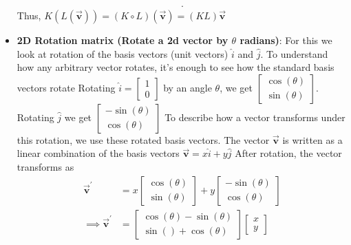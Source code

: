 \documentclass{report}
\begin{document}
\begin{itemize}
\begin{align*}
            .\end{align*}
            Thus, $K(L(\vec{\mathbf{v}})) = (K \circ L)(\vec{\mathbf{v}}) = (KL)\vec{\mathbf{v}}$
            \pagebreak 
        \item \textbf{2D Rotation matrix (Rotate a 2d vector by $\theta$ radians)}: For this we look at rotation of the basis vectors (unit vectors) $\hat{i}$ and $\hat{j}$. To understand how any arbitrary vector rotates, it's enough to see how the standard basis vectors rotate
            \bigbreak \noindent 
            Rotating $\hat{i} = \begin{bmatrix} 1 \\ 0 \end{bmatrix}$ by an angle $\theta$, we get $ \begin{bmatrix} \cos{\left(\theta \right)} \\ \sin{\left(\theta \right)}\end{bmatrix}$. Rotating $\hat{j}$ we get $ \begin{bmatrix}
                -\sin{\left(\theta \right)} \\ \cos{\left(\theta \right)}
            \end{bmatrix} $
            \bigbreak \noindent 
            To describe how a vector transforms under this rotation, we use these rotated basis vectors. The vector $\vec{\mathbf{v}} $ is written as a linear combination of the basis vectors $\vec{\mathbf{v}} = x\hat{i} + y\hat{j}$
            \bigbreak \noindent 
            After rotation, the vector transforms as 
            \begin{align*}
                \vec{\mathbf{v}}^{\prime} &= x \begin{bmatrix}\cos{\left(\theta \right)} \\ \sin{\left(\theta \right)}\end{bmatrix} +  y \begin{bmatrix} -\sin{\left(\theta \right)} \\ \cos{\left(\theta \right)}\end{bmatrix} \\
                \implies \vec{\mathbf{v}}^{\prime} &= \begin{bmatrix}
                    \cos{\left(\theta \right)} - \sin{\left(\theta \right)} \\  \sin{\left(\right)} + \cos{\left(\theta \right)}
                \end{bmatrix} \begin{bmatrix}
                    x \\ y

\end{bmatrix}
\end{align*}
\end{itemize}
\end{document}
